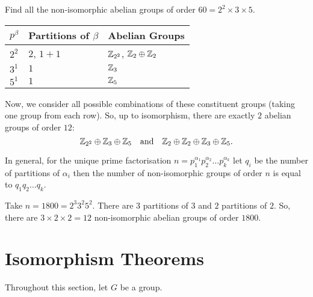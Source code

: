 \documentclass[11pt]{penrose}
\begin{document}
\begin{negg}
    Find all the non-isomorphic abelian groups of order $60 = 2^{2} \times 3 \times 5$.
    \begin{center}
        \begin{tabularx}{0.66\textwidth}{p{8mm}XX}
            \toprule
            $p^{\beta}$ & Partitions of $\beta$ & Abelian Groups\\
            \midrule
            $2^{2}$ & $2$, $1+1$ & $\mathbb{Z}_{2^{2}}$, $\mathbb{Z}_{2} \oplus \mathbb{Z}_{2}$ \\
            $3^{1}$ & $1$        & $\mathbb{Z}_{3}$ \\
            $5^{1}$ & $1$        & $\mathbb{Z}_{5}$ \\
            \bottomrule
        \end{tabularx}
    \end{center}
    Now, we consider all possible combinations of these constituent groups (taking one group from each row). So, up to isomorphism, there are exactly $2$ abelian groups of order $12$:
    \begin{equation*}
        \mathbb{Z}_{2^{2}} \oplus \mathbb{Z}_{3} \oplus \mathbb{Z}_{5}
        \quad\text{and}\quad 
        \mathbb{Z}_{2} \oplus \mathbb{Z}_{2} \oplus \mathbb{Z}_{3} \oplus \mathbb{Z}_{5}.
    \end{equation*}
\end{negg}

In general, for the unique prime factorisation $n = p_{1}^{\alpha_{1}} p_{2}^{\alpha_{2}} \dots p_{k}^{\alpha_{k}}$ let $q_{i}$ be the number of partitions of $\alpha_{i}$ then the number of non-isomorphic groups of order $n$ is equal to $q_{1} q_{2} \dots q_{k}$.

\begin{negg}
    Take $n = 1800 = 2^{3} 3^{2} 5^{2}$. There are $3$ partitions of $3$ and $2$ partitions of $2$. So, there are $3 \times 2 \times 2 = 12$ non-isomorphic abelian groups of order $1800$.
\end{negg}


\section{Isomorphism Theorems}

Throughout this section, let $G$ be a group.
\end{document}

